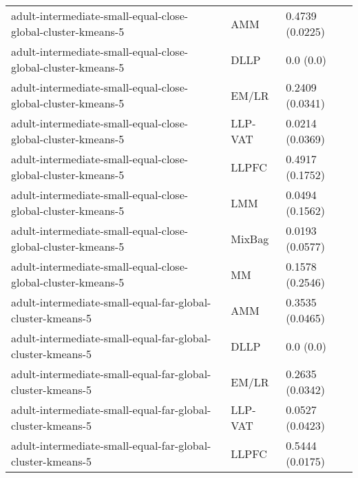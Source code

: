 \begin{longtable}{lll}
                                                 adult-intermediate-small-equal-close-global-cluster-kmeans-5 &       AMM &                       0.4739 (0.0225) \\
                                                 adult-intermediate-small-equal-close-global-cluster-kmeans-5 &      DLLP &                             0.0 (0.0) \\
                                                 adult-intermediate-small-equal-close-global-cluster-kmeans-5 &     EM/LR &                       0.2409 (0.0341) \\
                                                 adult-intermediate-small-equal-close-global-cluster-kmeans-5 &   LLP-VAT &                       0.0214 (0.0369) \\
                                                 adult-intermediate-small-equal-close-global-cluster-kmeans-5 &     LLPFC &                       0.4917 (0.1752) \\
                                                 adult-intermediate-small-equal-close-global-cluster-kmeans-5 &       LMM &                       0.0494 (0.1562) \\
                                                 adult-intermediate-small-equal-close-global-cluster-kmeans-5 &    MixBag &                       0.0193 (0.0577) \\
                                                 adult-intermediate-small-equal-close-global-cluster-kmeans-5 &        MM &                       0.1578 (0.2546) \\
                                                   adult-intermediate-small-equal-far-global-cluster-kmeans-5 &       AMM &                       0.3535 (0.0465) \\
                                                   adult-intermediate-small-equal-far-global-cluster-kmeans-5 &      DLLP &                             0.0 (0.0) \\
                                                   adult-intermediate-small-equal-far-global-cluster-kmeans-5 &     EM/LR &                       0.2635 (0.0342) \\
                                                   adult-intermediate-small-equal-far-global-cluster-kmeans-5 &   LLP-VAT &                       0.0527 (0.0423) \\
                                                   adult-intermediate-small-equal-far-global-cluster-kmeans-5 &     LLPFC &                       0.5444 (0.0175) \\

\end{longtable}
